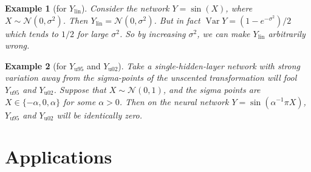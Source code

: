 \documentclass{article}
\newtheorem{example}{Example}
\DeclareMathOperator{\Var}{\operatorname{Var}}
\begin{document}
\begin{example}[for \(Y_\mathrm{lin}\)]
  Consider the network \(Y = \sin(X)\), where \(X \sim \mathcal N ({0, \sigma^2})\).
  Then \(Y_\mathrm{lin} = \mathcal{N}(0, \sigma^2)\).
  But in fact \(\Var Y = (1 - e^{-\sigma^2})/2\) which tends to \(1/2\) for large \(\sigma^2\).
  So by increasing \(\sigma^2\), we can make \(Y_\mathrm{lin}\) arbitrarily wrong.
\end{example}



\begin{example}[for \(Y_\mathrm{u95}\) and \(Y_\mathrm{u02}\)]
  Take a single-hidden-layer network with strong variation away from the sigma-points of the unscented transformation will fool \(Y_\mathrm{u95}\) and \(Y_\mathrm{u02}\).
  Suppose that \(X \sim \mathcal N(0, 1)\), and the sigma points are \(X \in \{-\alpha, 0, \alpha\}\) for some \(\alpha > 0\).
  Then on the neural network \(Y = \sin(\alpha^{-1}\pi X)\), \(Y_\mathrm{u95}\) and \(Y_\mathrm{u02}\) will be identically zero.
\end{example}


\section{Applications}
\end{document}
